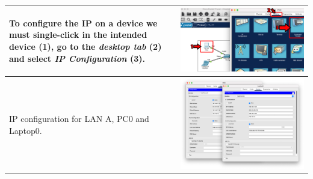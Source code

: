 \documentclass[11pt,a4paper]{report}
\begin{document}
\begin{flushleft}
\begin{center}
\begin{longtable}{ m{5cm} l }
                        To configure the IP on a device we must \textbf{single-click} in the intended device (1), go to the \textit{desktop tab} (2) and select \textit{IP Configuration} (3).  & \includegraphics[scale=0.32 ,valign=c]{CiscoPacketTracer_cmdOutput}   \\ \hline
                        IP configuration for LAN A, PC0 and Laptop0.                                                                                                                            & \includegraphics[scale=0.25 ,valign=c]{lana-ipall}                    \\ \hline

\end{longtable}
\end{center}
\end{flushleft}
\end{document}
